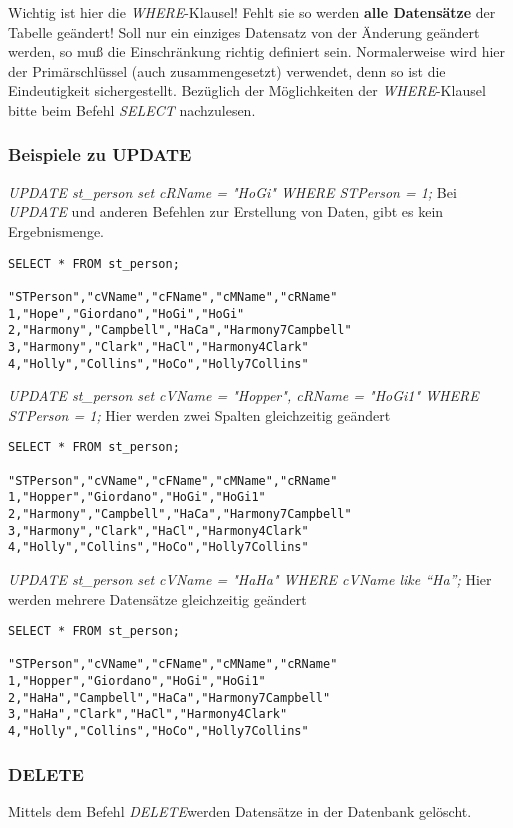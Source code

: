 Wichtig ist hier die \emph{WHERE}-Klausel! Fehlt sie so werden \textbf{alle Datensätze} der Tabelle geändert! Soll nur ein einziges Datensatz von der Änderung geändert werden, so muß die Einschränkung richtig definiert sein. Normalerweise wird hier der Primärschlüssel (auch zusammengesetzt) verwendet, denn so ist die Eindeutigkeit sichergestellt. Bezüglich der Möglichkeiten der \emph{WHERE}-Klausel bitte beim Befehl \emph{SELECT} nachzulesen.

\subsubsection{Beispiele zu UPDATE}
\emph{UPDATE st\_person set cRName = "HoGi" WHERE STPerson = 1;}
Bei \emph{UPDATE} und anderen Befehlen zur Erstellung von Daten, gibt es kein Ergebnismenge.
\begin{verbatim}
SELECT * FROM st_person;

"STPerson","cVName","cFName","cMName","cRName"
1,"Hope","Giordano","HoGi","HoGi"
2,"Harmony","Campbell","HaCa","Harmony7Campbell"
3,"Harmony","Clark","HaCl","Harmony4Clark"
4,"Holly","Collins","HoCo","Holly7Collins"
\end{verbatim}

\emph{UPDATE st\_person set cVName = "Hopper", cRName = "HoGi1"  WHERE STPerson = 1;}
Hier werden zwei Spalten gleichzeitig geändert
\begin{verbatim}
SELECT * FROM st_person;

"STPerson","cVName","cFName","cMName","cRName"
1,"Hopper","Giordano","HoGi","HoGi1"
2,"Harmony","Campbell","HaCa","Harmony7Campbell"
3,"Harmony","Clark","HaCl","Harmony4Clark"
4,"Holly","Collins","HoCo","Holly7Collins"
\end{verbatim}

\emph{UPDATE st\_person set cVName = "HaHa"  WHERE cVName like "`Ha"';}
Hier werden mehrere Datensätze gleichzeitig geändert
\begin{verbatim}
SELECT * FROM st_person;

"STPerson","cVName","cFName","cMName","cRName"
1,"Hopper","Giordano","HoGi","HoGi1"
2,"HaHa","Campbell","HaCa","Harmony7Campbell"
3,"HaHa","Clark","HaCl","Harmony4Clark"
4,"Holly","Collins","HoCo","Holly7Collins"
\end{verbatim}

\subsubsection{DELETE}
Mittels dem Befehl \emph{DELETE}werden Datensätze in der Datenbank gelöscht. 
